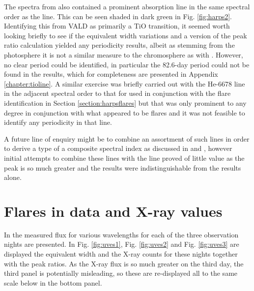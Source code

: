 The spectra from {\harps} also contained a prominent absorption line in the same spectral order as the {\ha} line. This
can be seen shaded in dark green in Fig. \ref{fig:harps2}. Identifying this from VALD as
primarily a TiO transition, it seemed worth looking briefly to see if the equivalent width variations and a version of
the peak ratio calculation yielded any periodicity results, albeit as stemming from the photosphere it is not a similar
measure to the chromosphere as with \ha. However, no clear period could be identified, in particular the 82.6-day period
could not be found in the results, which for completeness are presented in Appendix \ref{chapter:tioline}. A similar
exercise was briefly carried out with the He-6678 line in the adjacent spectral order to that for {\ha} used in
conjunction with the flare identification in Section \ref{section:harpsflares} but that was only prominent to any degree
in conjunction with what appeared to be flares and it was not feasible to identify any periodicity in that line.

A future line of enquiry might be to combine an assortment of such lines in order to derive a type of a composite
spectral index as discussed in \citet{hall99} and \citet{hall00}, however initial attempts to combine these lines with
the {\ha} line proved of little value as the {\ha} peak is so much greater and the results were indistinguishable from
the {\ha} results alone.

\section{Flares in {\uves} data and X-ray values}
\protect\label{section:uvesflares}

In \citet[fig. 1 to fig. 3]{fuhrmeister11} the measured flux for various wavelengths for each of the three observation
nights are presented. In Fig. \ref{fig:uves1}, Fig. \ref{fig:uves2} and Fig. \ref{fig:uves3} are displayed the {\ha}
equivalent width and the X-ray counts for these nights together with the peak ratios. As the X-ray flux is so much
greater on the third day, the third panel is potentially misleading, so these are re-displayed all to the same scale
below in the bottom panel.

